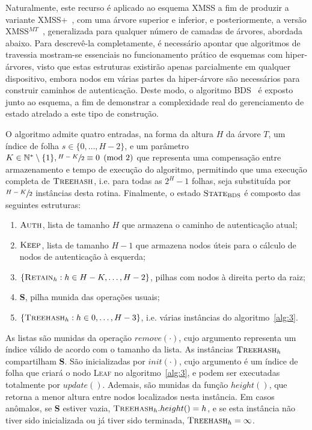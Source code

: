 \documentclass[12pt,notitlepage]{report}
\begin{document}
Naturalmente, este recurso é aplicado ao esquema XMSS a fim de produzir a variante XMSS+~\cite{xmssplus}, com uma árvore superior e inferior, e posteriormente, a versão XMSS$^{MT}$~\cite{xmssmt}, generalizada para qualquer número de camadas de árvores, abordada abaixo. Para descrevê-la completamente, é necessário apontar que algoritmos de travessia mostram-se essenciais no funcionamento prático de esquemas com hiper-árvores, visto que estas estruturas existirão apenas parcialmente em qualquer dispositivo, embora nodos em várias partes da hiper-árvore são necessários para construir caminhos de autenticação. Deste modo, o algoritmo BDS~\cite{Buchmann:2008:MTT:1473109.1473114} é exposto junto ao esquema, a fim de demonstrar a complexidade real do gerenciamento de estado atrelado a este tipo de construção.

O algoritmo admite quatro entradas, na forma da altura $H$ da árvore $T$, um índice de folha $s \in \{0, \dots, H - 2\}$, e um parâmetro $K \in \mathbb{N}^{*} \setminus \{1\}, \sfrac{H - K}{2} \equiv 0 \pmod{2}$ que representa uma compensação entre armazenamento e tempo de execução do algoritmo, permitindo que uma execução completa de $\textsc{Treehash}$, i.e. para todas as $2^H - 1$ folhas, seja substituída por $\sfrac{H - K}{2}$ instâncias desta rotina. Finalmente, o estado $\textsc{State}_{\textsc{BDS}}$ é composto das seguintes estruturas: 

\begin{enumerate}[label=(\roman*)]

    \item $\textsc{Auth}$, lista de tamanho $H$ que armazena o caminho de autenticação atual;

    \item $\textsc{Keep}$, lista de tamanho $H - 1$ que armazena nodos úteis para o cálculo de nodos de autenticação à esquerda;
    
    \item $\{\textsc{Retain}_{h} : h \in H - K, \dots, H - 2\}$, pilhas com nodos à direita perto da raiz;
    
    \item \textbf{S}, pilha munida das operações usuais;
    
    \item $\{\textsc{Treehash}_{h} : h \in 0, \dots, H - 3\}$, i.e. várias instâncias do algoritmo~\ref{alg:3}.
\end{enumerate}

As listas são munidas da operação $remove(\cdot)$, cujo argumento representa um índice válido de acordo com o tamanho da lista. As instâncias $\textsc{Treehash}_{h}$ compartilham \textbf{S}. São inicializadas por $init(\cdot)$, cujo argumento é um índice de folha que criará o nodo \textsc{Leaf} no algoritmo~\ref{alg:3}, e podem ser executadas totalmente por $update()$. Ademais, são munidas da função $height()$, que retorna a menor altura entre nodos localizados nesta instância. Em casos anômalos, se \textbf{S} estiver vazia, $\textsc{Treehash}_{h}.height() = h$, e se esta instância não tiver sido inicializada ou já tiver sido terminada, $\textsc{Treehash}_{h} = \infty$.
\end{document}
